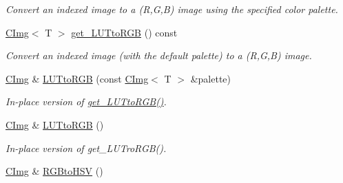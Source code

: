 \begin{DoxyCompactItemize}
\begin{DoxyCompactList}\small\item\em Convert an indexed image to a (R,G,B) image using the specified color palette. \item\end{DoxyCompactList}\item 
\hypertarget{structcimg__library_1_1_c_img_a8269a939d41fce5fcd1b775c409faa3d}{
\hyperlink{structcimg__library_1_1_c_img}{CImg}$<$ T $>$ \hyperlink{structcimg__library_1_1_c_img_a8269a939d41fce5fcd1b775c409faa3d}{get\_\-LUTtoRGB} () const }
\label{structcimg__library_1_1_c_img_a8269a939d41fce5fcd1b775c409faa3d}

\begin{DoxyCompactList}\small\item\em Convert an indexed image (with the default palette) to a (R,G,B) image. \item\end{DoxyCompactList}\item 
\hypertarget{structcimg__library_1_1_c_img_a6440d33314f665c5fc5f63fba3a55998}{
\hyperlink{structcimg__library_1_1_c_img}{CImg} \& \hyperlink{structcimg__library_1_1_c_img_a6440d33314f665c5fc5f63fba3a55998}{LUTtoRGB} (const \hyperlink{structcimg__library_1_1_c_img}{CImg}$<$ T $>$ \&palette)}
\label{structcimg__library_1_1_c_img_a6440d33314f665c5fc5f63fba3a55998}

\begin{DoxyCompactList}\small\item\em In-\/place version of \hyperlink{structcimg__library_1_1_c_img_a1dd7d85de2946959eb7d05b521703e1d}{get\_\-LUTtoRGB()}. \item\end{DoxyCompactList}\item 
\hypertarget{structcimg__library_1_1_c_img_a459316c96d223fa6c12578bd1ca63da4}{
\hyperlink{structcimg__library_1_1_c_img}{CImg} \& \hyperlink{structcimg__library_1_1_c_img_a459316c96d223fa6c12578bd1ca63da4}{LUTtoRGB} ()}
\label{structcimg__library_1_1_c_img_a459316c96d223fa6c12578bd1ca63da4}

\begin{DoxyCompactList}\small\item\em In-\/place version of get\_\-LUTroRGB(). \item\end{DoxyCompactList}\item 
\hypertarget{structcimg__library_1_1_c_img_a461f298887519c01842d1285d35a13c7}{
\hyperlink{structcimg__library_1_1_c_img}{CImg} \& \hyperlink{structcimg__library_1_1_c_img_a461f298887519c01842d1285d35a13c7}{RGBtoHSV} ()}
\label{structcimg__library_1_1_c_img_a461f298887519c01842d1285d35a13c7}


\end{DoxyCompactItemize}
